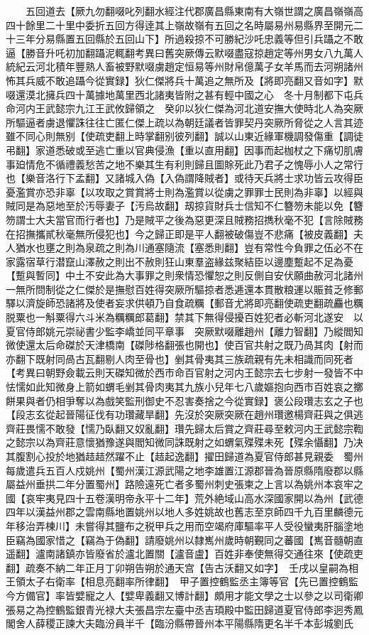 　　五回道去【厥九勿翻啜叱列翻水經注代郡廣昌縣東南有大嶺世謂之廣昌嶺嶺高四十餘里二十里中委折五回方得逹其上嶺故嶺有五回之名時屬易州易縣界至開元二十三年分易縣置五回縣於五回山下】所過殺掠不可勝紀沙吒忠義等但引兵躡之不敢逼【勝音升吒初加翻躡泥輒翻考異曰舊突厥傳云默啜盡寇掠趙定等州男女八九萬人統紀云河北積年豐熟人畜被野默啜虜趙定恒易等州財帛億萬子女羊馬而去河朔諸州怖其兵威不敢追躡今從實録】狄仁傑將兵十萬追之無所及【將即亮翻又音如字】默啜還漠北擁兵四十萬據地萬里西北諸夷皆附之甚有輕中國之心　冬十月制都下屯兵命河内王武懿宗九江王武攸歸領之　癸卯以狄仁傑為河北道安撫大使時北人為突厥所驅逼者虜退懼誅往往亡匿仁傑上疏以為朝廷議者皆罪契丹突厥所脅從之人言其迹雖不同心則無别【使疏吏翻上時掌翻别彼列翻】誠以山東近緣軍機調發傷重【調徒弔翻】家道悉破或至逃亡重以官典侵漁【重以直用翻】因事而起枷杖之下痛切肌膚事廹情危不循禮義愁苦之地不樂其生有利則歸且圖賖死此乃君子之愧辱小人之常行也【樂音洛行下孟翻】又諸城入偽【入偽謂降賊者】或待天兵將士求功皆云攻得臣憂濫賞亦恐非辜【以攻取之賞賞將士則為濫賞以從虜之罪罪士民則為非辜】以經與賊同是為惡地至於汚辱妻子【汚烏故翻】刼掠貨財兵士信知不仁簪笏未能以免【簪笏謂士大夫當官而行者也】乃是賊平之後為惡更深且賊務招擕秋毫不犯【言除賊務在招撫攜貳秋毫無所侵犯也】今之歸正即是平人翻被破傷豈不悲痛【被皮義翻】夫人猶水也壅之則為泉疏之則為川通塞隨流【塞悉則翻】豈有常性今負罪之伍必不在家露宿草行潜竄山澤赦之則出不赦則狂山東羣盗緣兹聚結臣以邊塵蹔起不足為憂【蹔與暫同】中土不安此為大事罪之則衆情恐懼恕之則反側自安伏願曲赦河北諸州一無所問制從之仁傑於是撫慰百姓得突厥所驅掠者悉逓還本貫散粮運以賑貧乏修郵驛以濟旋師恐諸將及使者妄求供頓乃自食疏糲【郵音尤將即亮翻使疏吏翻疏麤也糲脱粟也一斛粟得六斗米為糲糲郎葛翻】禁其下無得侵擾百姓犯者必斬河北遂安　以夏官侍郎姚元崇祕書少監李嶠並同平章事　突厥默啜離趙州【離力智翻】乃縱閻知微使還太后命磔於天津橋南【磔陟格翻張也開也】使百官共射之既乃咼其肉【射而亦翻下既射同咼古瓦翻剔人肉至骨也】剉其骨夷其三族疏親有先未相識而同死者　【考異曰朝野僉載云則天磔知微於西市命百官射之河内王懿宗去七步射一發皆不中怯懦如此知微身上箭如蝟毛剉其骨肉夷其九族小兒年七八歲嫗抱向西市百姓哀之擲餅果與者仍相爭奪以為戲笑監刑御史不忍害奏捨之今從實録】褒公段瓚志玄之子也【段志玄從起晉陽征伐有功瓚藏旱翻】先沒於突厥突厥在趙州瓚邀楊齊莊與之俱逃齊莊畏懦不敢發【懦乃臥翻又奴亂翻】瓚先歸太后賞之齊莊尋至敕河内王武懿宗鞫之懿宗以為齊莊意懷猶豫遂與閻知微同誅既射之如蝟氣殜殜未死【殜余懾翻】乃决其腹割心投於地猶趌趌然躍不止【趌起逸翻】擢田歸道為夏官侍郎甚見親委　蜀州每歲遣兵五百人戍姚州【蜀州漢江源武陽之地李雄置江源郡晉為晉原縣隋廢郡以縣屬益州垂拱二年分置蜀州】路險遠死亡者多蜀州刺史張柬之上言以為姚州本哀牢之國【哀牢夷見四十五卷漢明帝永平十二年】荒外絶域山高水深國家開以為州【武德四年以漢益州郡之雲南縣地置姚州以地人多姓姚故也舊志至京師四千九百里麟德元年移治弄棟川】未嘗得其鹽布之税甲兵之用而空竭府庫驅率平人受役蠻夷肝腦塗地臣竊為國家惜之【竊為于偽翻】請廢姚州以隸嶲州歲時朝覲同之蕃國【嶲音髓朝直遥翻】瀘南諸鎮亦皆廢省於瀘北置關【瀘音盧】百姓非奉使無得交通往來【使疏吏翻】疏奏不納二年正月丁卯朔告朔於通天宫【告古沃翻又如字】　壬戌以皇嗣為相王領太子右衛率【相息亮翻率所律翻】　甲子置控鶴監丞主簿等官【先已置控鶴監今方備官】率皆嬖寵之人【嬖卑義翻又博計翻】頗用才能文學之士以參之以司衛卿張易之為控鶴監銀青光禄大夫張昌宗左臺中丞吉頊殿中監田歸道夏官侍郎李迥秀鳳閣舍人薛稷正諫大夫臨汾員半千【臨汾縣帶晉州本平陽縣隋更名半千本彭城劉氏